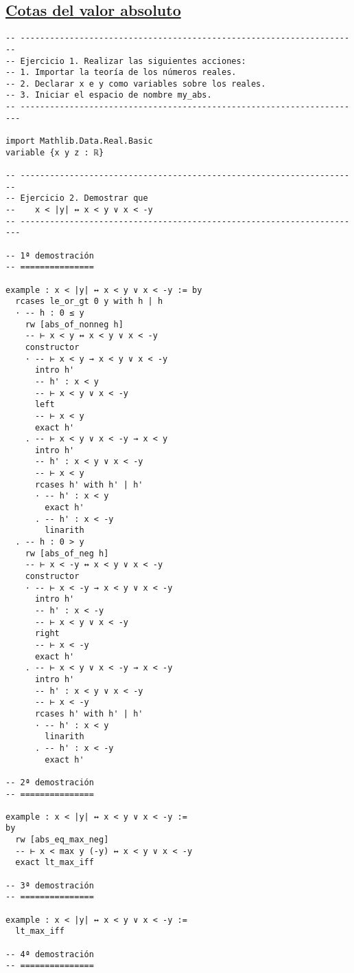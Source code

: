 \subsection{\href{./src/Logica/Cotas\_del\_valor\_absoluto.lean}{Cotas del valor absoluto}}
\label{sec:org6d735ec}
\begin{verbatim}
-- ---------------------------------------------------------------------
-- Ejercicio 1. Realizar las siguientes acciones:
-- 1. Importar la teoría de los números reales.
-- 2. Declarar x e y como variables sobre los reales.
-- 3. Iniciar el espacio de nombre my_abs.
-- ----------------------------------------------------------------------

import Mathlib.Data.Real.Basic
variable {x y z : ℝ}

-- ---------------------------------------------------------------------
-- Ejercicio 2. Demostrar que
--    x < |y| ↔ x < y ∨ x < -y
-- ----------------------------------------------------------------------

-- 1ª demostración
-- ===============

example : x < |y| ↔ x < y ∨ x < -y := by
  rcases le_or_gt 0 y with h | h
  · -- h : 0 ≤ y
    rw [abs_of_nonneg h]
    -- ⊢ x < y ↔ x < y ∨ x < -y
    constructor
    · -- ⊢ x < y → x < y ∨ x < -y
      intro h'
      -- h' : x < y
      -- ⊢ x < y ∨ x < -y
      left
      -- ⊢ x < y
      exact h'
    . -- ⊢ x < y ∨ x < -y → x < y
      intro h'
      -- h' : x < y ∨ x < -y
      -- ⊢ x < y
      rcases h' with h' | h'
      · -- h' : x < y
        exact h'
      . -- h' : x < -y
        linarith
  . -- h : 0 > y
    rw [abs_of_neg h]
    -- ⊢ x < -y ↔ x < y ∨ x < -y
    constructor
    · -- ⊢ x < -y → x < y ∨ x < -y
      intro h'
      -- h' : x < -y
      -- ⊢ x < y ∨ x < -y
      right
      -- ⊢ x < -y
      exact h'
    . -- ⊢ x < y ∨ x < -y → x < -y
      intro h'
      -- h' : x < y ∨ x < -y
      -- ⊢ x < -y
      rcases h' with h' | h'
      · -- h' : x < y
        linarith
      . -- h' : x < -y
        exact h'

-- 2ª demostración
-- ===============

example : x < |y| ↔ x < y ∨ x < -y :=
by
  rw [abs_eq_max_neg]
  -- ⊢ x < max y (-y) ↔ x < y ∨ x < -y
  exact lt_max_iff

-- 3ª demostración
-- ===============

example : x < |y| ↔ x < y ∨ x < -y :=
  lt_max_iff

-- 4ª demostración
-- ===============


\end{verbatim}
